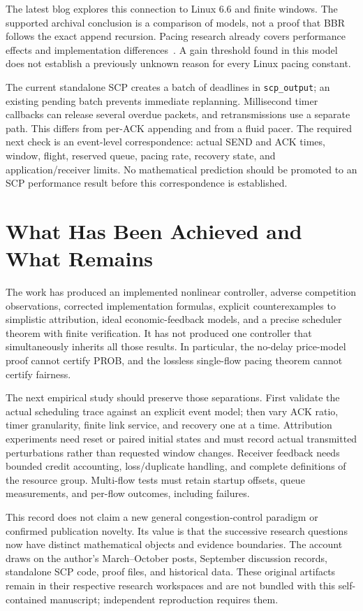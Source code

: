 \documentclass[conference,letterpaper]{IEEEtran}
\begin{document}
The latest blog explores this connection to Linux 6.6 and finite windows. The supported archival conclusion is a comparison of models, not a proof that BBR follows the exact append recursion. Pacing research already covers performance effects and implementation differences~\cite{aggarwal,quic}. A gain threshold found in this model does not establish a previously unknown reason for every Linux pacing constant.

The current standalone SCP creates a batch of deadlines in \texttt{scp\_output}; an existing pending batch prevents immediate replanning. Millisecond timer callbacks can release several overdue packets, and retransmissions use a separate path. This differs from per-ACK appending and from a fluid pacer. The required next check is an event-level correspondence: actual SEND and ACK times, window, flight, reserved queue, pacing rate, recovery state, and application/receiver limits. No mathematical prediction should be promoted to an SCP performance result before this correspondence is established.

\section{What Has Been Achieved and What Remains}
The work has produced an implemented nonlinear controller, adverse competition observations, corrected implementation formulas, explicit counterexamples to simplistic attribution, ideal economic-feedback models, and a precise scheduler theorem with finite verification. It has not produced one controller that simultaneously inherits all those results. In particular, the no-delay price-model proof cannot certify PROB, and the lossless single-flow pacing theorem cannot certify fairness.

The next empirical study should preserve those separations. First validate the actual scheduling trace against an explicit event model; then vary ACK ratio, timer granularity, finite link service, and recovery one at a time. Attribution experiments need reset or paired initial states and must record actual transmitted perturbations rather than requested window changes. Receiver feedback needs bounded credit accounting, loss/duplicate handling, and complete definitions of the resource group. Multi-flow tests must retain startup offsets, queue measurements, and per-flow outcomes, including failures.

This record does not claim a new general congestion-control paradigm or confirmed publication novelty. Its value is that the successive research questions now have distinct mathematical objects and evidence boundaries. The account draws on the author's March--October posts, September discussion records, standalone SCP code, proof files, and historical data. These original artifacts remain in their respective research workspaces and are not bundled with this self-contained manuscript; independent reproduction requires them.
\end{document}
